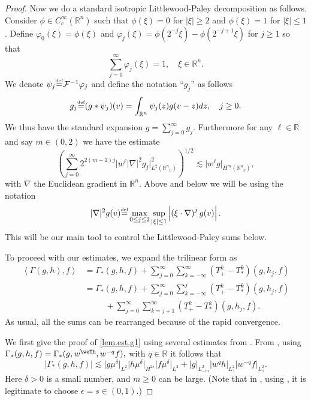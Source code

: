 \documentclass{amsart}
\numberwithin{equation}{section}
\begin{document}
\begin{proof}
Now we do a standard isotropic Littlewood-Paley decomposition 
as follows.  
Consider $\phi\in C_c^\infty({{\mathbb R}^{n}})$ such that $\phi(\xi) = 0$ for $|\xi| \ge 2$ and $\phi(\xi) = 1$ for $|\xi| \le 1$.
Define $\varphi_0(\xi)=  \phi(\xi)$ and $\varphi_j(\xi)= \phi(2^{-j}\xi)- \phi(2^{-j+1}\xi)$ for $j\ge 1$ so that
$$
\sum_{j=0}^\infty \varphi_j(\xi)=1,\quad \xi\in {{\mathbb R}^{n}}.
$$
We denote $\psi_j {\overset{\mbox{\tiny{def}}}{=}} \mathcal{F}^{-1}\varphi_j$ and define the notation  ``$g_j$'' 
 as follows 
$$
g_j  {\overset{\mbox{\tiny{def}}}{=}} (g * \psi_j)({v}) = \int_{{\mathbb R}^{n}}\psi_j(z)g({v}-z)dz, \quad j\ge 0. 
$$
We thus have the standard expansion 
$
g  = \sum_{j=0}^\infty g_j.
$ 
Furthermore for any ${\ell} \in {\mathbb{R}}$ and say $m\in (0,2)$ we have the estimate 
\begin{equation}\label{l.s.equiv}
\left(\sum_{j=0}^\infty
2^{2(m-2)j}
{|} w^{\ell} \left| \nabla \right|^2 g_j {|}_{L^2({{\mathbb R}^{n}}_{v})}^2 \right)^{1/2}
\lesssim
{|} w^{\ell} g {|}_{H^m({{\mathbb R}^{n}}_{v})},
\end{equation}
with $\nabla$ the Euclidean gradient in ${{\mathbb R}^{n}}$.   
Above and below we will be using the notation
$$
|\nabla|^2 g({v}) {\overset{\mbox{\tiny{def}}}{=}} 
\max_{0\le j \leq 2}\sup_{|\xi| \leq 1} \left| \left(\xi \cdot \nabla \right)^j g({v}) \right|.
$$
This will be our main tool to control the Littlewood-Paley sums below.

To proceed with our estimates, we expand the trilinear form as
\begin{align}
{ \left< {{ \Gamma(g,h),f}} \right> } & = 
 {\Gamma_{*}}(g,h,f)
+
\sum_{j=0}^\infty \sum_{k=-\infty}^\infty ({T^{k}_{+}} - {T^{k}_{*}})(g,h_j,f) \nonumber \\
& = 
 {\Gamma_{*}}(g,h,f)
\label{sum1} 
+ \sum_{j=0}^\infty \sum_{k=-\infty}^j ({T^{k}_{+}} - {T^{k}_{*}})(g,h_j,f) 
\\
& \hspace{30pt} + \sum_{j=0}^\infty \sum_{k=j+1}^\infty ({T^{k}_{+}} - {T^{k}_{*}})(g,h_j,f) \label{sum2}.
\end{align}
As usual, all the sums can be rearranged because of the rapid convergence.

We first give the proof of \eqref{lem.est.g1} using several estimates from \cite{gsNonCut0}.  From \cite[Proposition 3.4]{gsNonCut0}, using 
$
{\Gamma_{*}}(g,h,f)
=
 {\Gamma_{*}}(g, w^\weTh,w^{-{q}}f),
$
with ${q} \in {\mathbb{R}}$ it follows that 
$$
\left| {\Gamma_{*}}(g,h,f) \right|
\lesssim
      {|} g {\mu}^\delta {|}_{L^2} 
  {|}  h {\mu}^\delta {|}_{H^{2s}} 
 {|}  f {\mu}^\delta {|}_{L^2} 
 + 
 {|} g {|}_{L^2_{-m}} 
  {|} w^{q} h{|}_{L^2_{\gamma}} 
 {|} w^{-{q}} f{|}_{L^2_{\gamma}}.
$$
Here $\delta>0$ is a small number, and $m\ge 0$ can be large.  (Note that in \cite[Proposition 3.4]{gsNonCut0}, using 
\cite[Proposition 3.5]{gsNonCut0}, it is legitimate to choose $\epsilon =s\in(0,1)$.)


\end{proof}
\end{document}
